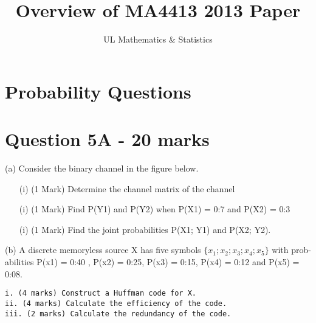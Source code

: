 \documentclass[]{article}
\title{Overview of MA4413 2013 Paper}
\author{UL Mathematics \& Statistics}
\begin{document}
\maketitle

\newpage
\section{Probability Questions}

\newpage
\section*{Question 5A - 20 marks}
(a) Consider the binary channel in the figure below.

\begin{itemize}
\item[(i)] (1 Mark) Determine the channel matrix of the channel
\item[(i)] (1 Mark)  Find P(Y1) and P(Y2) when P(X1) = 0:7 and P(X2) = 0:3
\item[(i)] (1 Mark)  Find the joint probabilities P(X1; Y1) and P(X2; Y2).
\end{itemize}
(b) A discrete memoryless source X has five symbols $\{x_1; x_2; x_3; x_4; x_5\}$ with prob-
abilities P(x1) = 0:40 , P(x2) = 0:25, P(x3) = 0:15, P(x4) = 0:12 and
P(x5) = 0:08.
\begin{verbatim}
i. (4 marks) Construct a Huffman code for X.
ii. (4 marks) Calculate the efficiency of the code.
iii. (2 marks) Calculate the redundancy of the code.
\end{verbatim}
\end{document}
